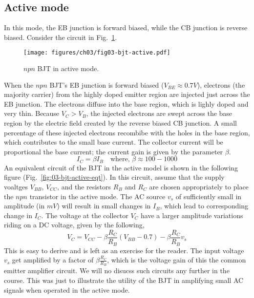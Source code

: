 \subsection{Active mode}
In this mode, the EB junction is forward biased, while the CB junction is reverse biased. Consider the circuit in Fig.~\ref{fig:03-bjt-active}.
\begin{figure}[h]
    \centering
    \texttt{[image: figures/ch03/fig03-bjt-active.pdf]}
    \caption{$npn$ BJT in active mode.}
    \label{fig:03-bjt-active}
\end{figure}
When the $npn$ BJT's EB junction is forward biased ($V_{BE} \approx 0.7V$), electrons (the majority carrier) from the highly doped emitter region are injected just across the EB junction. The electrons diffuse into the base region, which is lighly doped and very thin. Because $V_C > V_B$, the injected electrons are swept across the base region by the electric field created by the reverse biased CB junction. A small percentage of these injected electrons recombibe with the holes in the base region, which contributes to the small base current. The collector current will be proportional the base current; the current gain is given by the parameter $\beta$.
\begin{equation}
    I_C = \beta I_B \quad \text{where, } \beta \approx 100 - 1000
    \label{eq:03-bjt-active-ic}
\end{equation}
An equivalent circuit of the BJT in the active model is shown in the following figure (Fig.~\ref{fig:03-bjt-active-eqt}). In this circuit, assume that the supply voaltges $V_{BB}$, $V_{CC}$, and the resistors $R_B$ and $R_C$ are chosen appropriately to place the $npn$ transistor in the active mode. The AC source $v_{s}$ of sufficiently small in amplitude (in $mV$) will result in small changes in $I_B$, which lead to corresponding change in $I_C$. The voltage at the collector $V_C$ have a larger amplitude variations riding on a DC voltage, given by the following,
\begin{equation}
    V_C = V_{CC} - \beta \frac{R_C}{R_B}\left(V_{BB} - 0.7 \right) -  \beta \frac{R_C}{R_B} v_s
    \label{eq:03-bjt-active-vc}
\end{equation}
This is easy to derive and is left as an exercise for the reader. The input voltage $v_s$ get amplified by a factor of $\beta \frac{R_C}{R_B}$, which is the voltage gain of this the common emitter amplifier circuit. We will no disucss such circuits any further in the course. This was just to illustrate the utility of the BJT in amplifying small AC signals when operated in the active mode.
